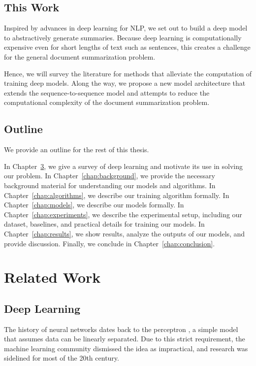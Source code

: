 \documentclass[12pt]{report}
\begin{document}
\section{This Work}

Inspired by advances in deep learning for NLP, we set out to build a deep model to abstractively generate summaries. Because deep learning is computationally expensive even for short lengths of text such as sentences, this creates a challenge for the general document summarization problem.

Hence, we will survey the literature for methods that alleviate the computation of training deep models. Along the way, we propose a new model architecture that extends the sequence-to-sequence model and attempts to reduce the computational complexity of the document summarization problem.

\section{Outline}


We provide an outline for the rest of this thesis.

In Chapter~\ref{chap:related}, we give a survey of deep learning and motivate its use in solving our problem.
In Chapter~\ref{chap:background}, we provide the necessary background material for understanding our models and algorithms.
In Chapter~\ref{chap:algorithms}, we describe our training algorithm formally.
In Chapter~\ref{chap:models}, we describe our models formally.
In Chapter~\ref{chap:experiments}, we describe the experimental setup, including our dataset, baselines, and practical details for training our models.
In Chapter~\ref{chap:results}, we show results, analyze the outputs of our models, and provide discussion.
Finally, we conclude in Chapter~\ref{chap:conclusion}.


\chapter{Related Work}
\label{chap:related}


\section{Deep Learning}

The history of neural networks dates back to the perceptron \citep{Rosenblatt1958}, a simple model that assumes data can be linearly separated. Due to this strict requirement, the machine learning community dismissed the idea as impractical, and research was sidelined for most of the 20th century.
\end{document}
